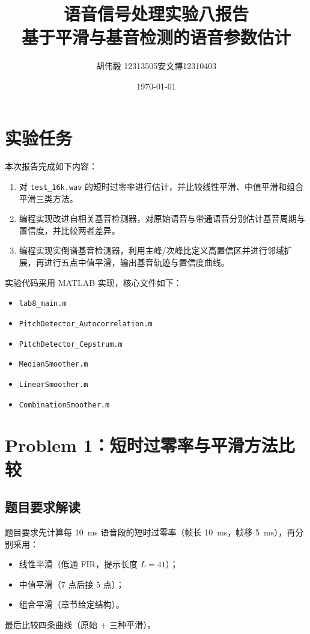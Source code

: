 \documentclass[UTF8,a4paper,12pt]{ctexart}
\title{语音信号处理实验八报告\\基于平滑与基音检测的语音参数估计}
\author{胡伟毅 12313505\quad 安文博12310403}
\date{\today}
\begin{document}
\maketitle

\section{实验任务}
本次报告完成如下内容：
\begin{enumerate}
    \item 对 \texttt{test\_16k.wav} 的短时过零率进行估计，并比较线性平滑、中值平滑和组合平滑三类方法。
    \item 编程实现改进自相关基音检测器，对原始语音与带通语音分别估计基音周期与置信度，并比较两者差异。
    \item 编程实现实倒谱基音检测器，利用主峰/次峰比定义高置信区并进行邻域扩展，再进行五点中值平滑，输出基音轨迹与置信度曲线。
\end{enumerate}

实验代码采用 MATLAB 实现，核心文件如下：
\begin{itemize}
    \item \texttt{lab8\_main.m}
    \item \texttt{PitchDetector\_Autocorrelation.m}
    \item \texttt{PitchDetector\_Cepstrum.m}
    \item \texttt{MedianSmoother.m}
    \item \texttt{LinearSmoother.m}
    \item \texttt{CombinationSmoother.m}
\end{itemize}

\section{Problem 1：短时过零率与平滑方法比较}
\subsection{题目要求解读}
题目要求先计算每 \SI{10}{ms} 语音段的短时过零率（帧长 \SI{10}{ms}，帧移 \SI{5}{ms}），再分别采用：
\begin{itemize}
    \item 线性平滑（低通 FIR，提示长度 $L=41$）；
    \item 中值平滑（7 点后接 5 点）；
    \item 组合平滑（章节给定结构）。
\end{itemize}
最后比较四条曲线（原始 + 三种平滑）。
\end{document}

